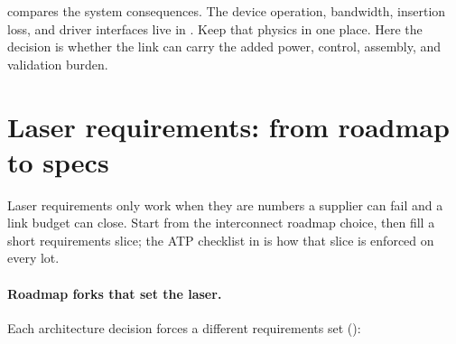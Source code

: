  compares the system consequences. The device
operation, bandwidth, insertion loss, and driver interfaces live in
. Keep that
physics in one place. Here the decision is whether the link can carry the added
power, control, assembly, and validation burden.

\section{Laser requirements: from roadmap to specs}
\label{sec:laser-reqs}

Laser requirements only work when they are numbers a supplier can fail and a link
budget can close. Start from the interconnect roadmap choice, then fill a short
requirements slice; the ATP checklist in
 is how that slice is enforced
on every lot.

\paragraph{Roadmap forks that set the laser.}
Each architecture decision forces a different requirements set
():

